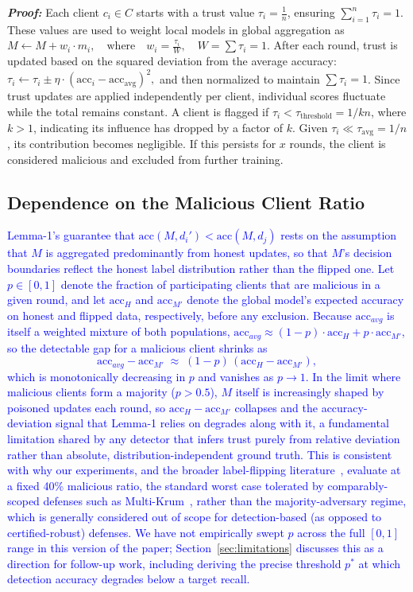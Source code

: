 \documentclass[conference]{IEEEtran}
\begin{document}
\textit{\textbf{Proof:}} Each client \( c_i \in C \) starts with a trust value \( \tau_i = \frac{1}{n} \), ensuring \( \sum_{i=1}^n \tau_i = 1 \). These values are used to weight local models in global aggregation as  \(M \gets M + w_i \cdot m_i, \quad \text{where} \quad w_i = \frac{\tau_i}{W}, \quad W = \sum \tau_i = 1.\) After each round, trust is updated based on the squared deviation from the average accuracy: \(
\tau_i \gets \tau_i \pm \eta \cdot (\text{acc}_i - \text{acc}_{\text{avg}})^2, \)
and then normalized to maintain \( \sum \tau_i = 1 \). Since trust updates are applied independently per client, individual scores fluctuate while the total remains constant. A client is flagged if \( \tau_i < \tau_{\text{threshold}} = {1} / {kn} \), where \( k > 1 \), indicating its influence has dropped by a factor of \( k \). Given \( \tau_i \ll \tau_{\text{avg}} = {1} / {n} \), its contribution becomes negligible. If this persists for \( x \)  rounds, the client is considered malicious and excluded from further training.

\subsection{Dependence on the Malicious Client Ratio}
\label{sec:ratioanalysis}
\textcolor{blue}{Lemma-1's guarantee that $\text{acc}(M, d_i') < \text{acc}(M, d_j)$ rests on the assumption that $M$ is aggregated predominantly from honest updates, so that $M$'s decision boundaries reflect the honest label distribution rather than the flipped one. Let $p \in [0,1]$ denote the fraction of participating clients that are malicious in a given round, and let $\text{acc}_H$ and $\text{acc}_{M'}$ denote the global model's expected accuracy on honest and flipped data, respectively, before any exclusion. Because $\text{acc}_{avg}$ is itself a weighted mixture of both populations, $\text{acc}_{avg} \approx (1-p)\cdot \text{acc}_H + p \cdot \text{acc}_{M'}$, so the detectable gap for a malicious client shrinks as
\[
\text{acc}_{avg} - \text{acc}_{M'} \;\approx\; (1-p)\,(\text{acc}_H - \text{acc}_{M'}),
\]
which is monotonically decreasing in $p$ and vanishes as $p \to 1$. In the limit where malicious clients form a majority ($p > 0.5$), $M$ itself is increasingly shaped by poisoned updates each round, so $\text{acc}_H - \text{acc}_{M'}$ collapses and the accuracy-deviation signal that Lemma-1 relies on degrades along with it, a fundamental limitation shared by any detector that infers trust purely from relative deviation rather than absolute, distribution-independent ground truth. This is consistent with why our experiments, and the broader label-flipping literature~\cite{tolpegin2020data,jebreel2024lfighter}, evaluate at a fixed 40\% malicious ratio, the standard worst case tolerated by comparably-scoped defenses such as Multi-Krum~\cite{NIPS2017_f4b9ec30}, rather than the majority-adversary regime, which is generally considered out of scope for detection-based (as opposed to certified-robust) defenses. We have not empirically swept $p$ across the full $[0,1]$ range in this version of the paper; Section~\ref{sec:limitations} discusses this as a direction for follow-up work, including deriving the precise threshold $p^*$ at which detection accuracy degrades below a target recall.}
\end{document}
